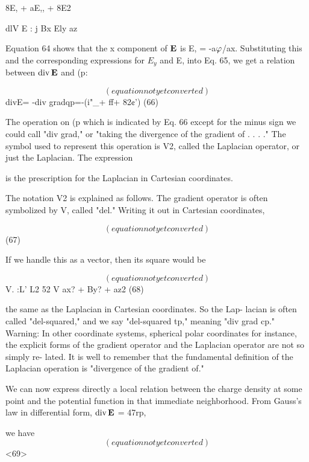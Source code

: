 8E, + aE,, + 8E2

dlV E : j
Bx Ely az

Equation 64 shows that the x component of $\mathbf{E}$ is E, = -a$\varphi$/ax.
Substituting this and the corresponding expressions for $E_y$ and E,
into Eq. 65, we get a relation between $\operatorname{div}\mathbf{E}$ and (p:

\begin{equation}
(equation not yet converted)
\end{equation}
divE= -div gradqp=-(i"_+ ff+ 82¢') (66)

The operation on (p which is indicated by Eq. 66 except for the minus
sign we could call "div grad," or "taking the divergence of the
gradient of . . . ." The symbol used to represent this operation is V2,
called the Laplacian operator, or just the Laplacian. The expression

is the prescription for the Laplacian in Cartesian coordinates.

The notation V2 is explained as follows. The gradient operator is
often symbolized by V, called "del." Writing it out in Cartesian
coordinates,

\begin{equation}
(equation not yet converted)
\end{equation}
(67)

If we handle this as a vector, then its square would be

\begin{equation}
(equation not yet converted)
\end{equation}
V. :L' L2 52
V ax? + By? + az2 (68)

the same as the Laplacian in Cartesian coordinates. So the Lap-
lacian is often called "del-squared," and we say "del-squared tp,"
meaning "div grad cp." Warning: In other coordinate systems,
spherical polar coordinates for instance, the explicit forms of the
gradient operator and the Laplacian operator are not so simply re-
lated. It is well to remember that the fundamental definition of the
Laplacian operation is "divergence of the gradient of."

We can now express directly a local relation between the charge
density at some point and the potential function in that immediate
neighborhood. From Gauss's law in differential form, $\operatorname{div}\mathbf{E}$ = 47rp,

we have
\begin{equation}
(equation not yet converted)
\end{equation}
<69>

